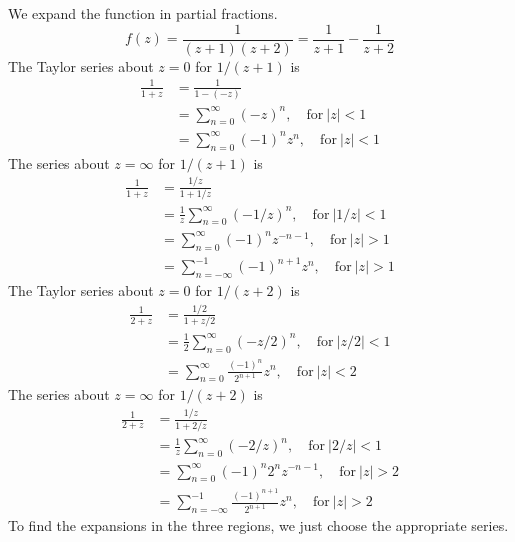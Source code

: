 {%
\begin{Solution}
  \label{solution laurent 1/((z+1)(z+2))}
  We expand the function in partial fractions.
  \[
  f(z) = \frac{1}{(z + 1) (z + 2)} = \frac{1}{z + 1} - \frac{1}{z + 2}
  \]
  The Taylor series about $z = 0$ for $1/(z + 1)$ is
  \begin{align*}
    \frac{1}{1 + z}
    &= \frac{1}{1 - (-z)} 
    \\
    &= \sum_{n = 0}^\infty (-z)^n, \quad \mathrm{for}\ |z| < 1 
    \\
    &= \sum_{n = 0}^\infty (-1)^n z^n, \quad \mathrm{for}\ |z| < 1 
  \end{align*}
  The series about $z = \infty$ for $1/(z + 1)$ is
  \begin{align*}
    \frac{1}{1 + z}
    &= \frac{1/z}{1 + 1/z} 
    \\
    &= \frac{1}{z} \sum_{n = 0}^\infty (-1/z)^n, \quad \mathrm{for}\ |1/z| < 1 
    \\
    &= \sum_{n = 0}^\infty (-1)^n z^{-n - 1}, \quad \mathrm{for}\ |z| > 1 
    \\
    &= \sum_{n = -\infty}^{-1} (-1)^{n+1} z^n, \quad \mathrm{for}\ |z| > 1
  \end{align*}
  The Taylor series about $z = 0$ for $1/(z + 2)$ is
  \begin{align*}
    \frac{1}{2 + z}
    &= \frac{1/2}{1 + z/2} 
    \\
    &= \frac{1}{2} \sum_{n = 0}^\infty (-z/2)^n, \quad \mathrm{for}\ |z/2| < 1 
    \\
    &= \sum_{n = 0}^\infty \frac{(-1)^n}{2^{n+1}} z^n, \quad \mathrm{for}\ |z| < 2 
  \end{align*}
  The series about $z = \infty$ for $1/(z + 2)$ is
  \begin{align*}
    \frac{1}{2 + z}
    &= \frac{1/z}{1 + 2/z} 
    \\
    &= \frac{1}{z} \sum_{n = 0}^\infty (-2/z)^n, \quad \mathrm{for}\ |2/z| < 1 
    \\
    &= \sum_{n = 0}^\infty (-1)^n 2^n z^{-n - 1}, \quad \mathrm{for}\ |z| > 2 
    \\
    &= \sum_{n = -\infty}^{-1} \frac{(-1)^{n+1}}{2^{n+1}} z^n, \quad \mathrm{for}\ |z| > 2 
  \end{align*}
  To find the expansions in the three regions, we just choose the appropriate
  series.


\end{Solution}}
